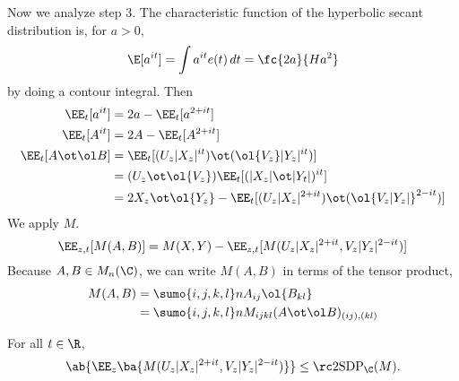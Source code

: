 Now we analyze step 3. The characteristic function of the hyperbolic secant distribution is, for $a>0$,
\[
\E[a^{it}] = \int a^{it}e(t)\,dt = \fc{2a}{Ha^2}
\]
by doing a contour integral.
Then 
\begin{align}
\EE_t[a^{it}] &=2a-\EE_t [a^{2+it}]\\
\EE_t[A^{it}]&=2A - \EE_t[A^{2+it}]\\
\EE_t[A\ot \ol B] &=\EE_t[(U_z|X_z|^{it}) \ot (\ol{V_z} |Y_z|^{it})]\\
&=(U_z\ot \ol{V_z}) \EE_t [(|X_z|\ot |Y_t|)^{it}]\\
&=2X_z\ot \ol{Y_z} - \EE_t[(U_z|X_z|^{2+it})\ot (\ol{V_z|Y_z|}^{2-it})]
\end{align}
We apply $M$. 
\[
\EE_{z,t} [M(A,B)] = M(X,Y) - \EE_{z,t}[M(U_z|X_z|^{2+it}, V_z|Y_z|^{2-it})]
\]
Because $A,B\in M_n(\C)$, we can write $M(A,B)$ in terms of the tensor product, 
\begin{align}
M(A,B) &= \sumo{i,j,k,l}n A_{ij} \ol{B_{kl}}\\
&= \sumo{i,j,k,l}n M_{ijkl} (A\ot \ol B)_{(ij),(kl)}
\end{align}
\begin{clm}
For all $t\in \R$,
\[
\ab{\EE_z \ba{M(U_z|X_z|^{2+it}, V_z|Y_z|^{2-it})}}\le \rc2\text{SDP}_\C(M).
\]
\end{clm}
